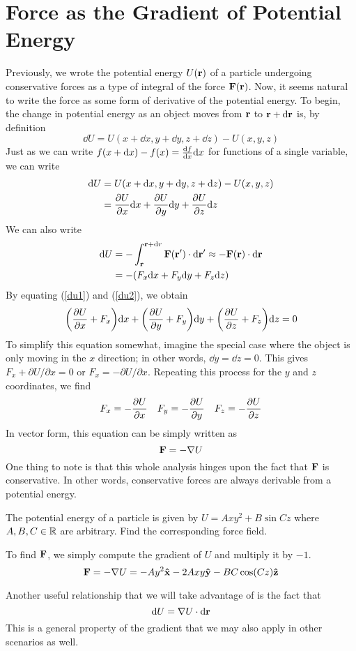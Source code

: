 \section{Force as the Gradient of Potential Energy}
Previously, we wrote the potential energy $U(\mathbf{r})$ of a particle undergoing conservative forces as a type of integral of the force $\mathbf{F}(\mathbf{r})$. Now, it seems natural to write the force as some form of derivative of the potential energy. To begin, the change in potential energy as an object moves from $\mathbf{r}$ to $\mathbf{r} + \dd \mathbf{r}$ is, by definition
\[ \dd U = U(x + \dd x, y + \dd y, z + \dd z) - U(x, y, z) \]
Just as we can write $f(x + \dd x) - f(x) = \dv{f}{x}\dd x$ for functions of a single variable, we can write
\begin{align}
    \dd U &=  U(x + \dd x, y + \dd y, z + \dd z) - U(x, y, z) \nonumber \\
    &= \pdv{U}{x}\dd x + \pdv{U}{y}\dd y + \pdv{U}{z}\dd z \label{du1}
\end{align}
We can also write 
\begin{align}
    \dd U &= -\int_{\mbf r}^{\mbf r + \dd r} \mbf{F}(\mbf{r}') \cdot \dd \mbf{r}' \approx -\mbf{F}(\mbf{r})\cdot \dd \mbf{r} \nonumber \\
    &= -\pqty{F_x\dd x + F_y\dd y + F_z\dd z } \label{du2}
\end{align}
By equating (\ref{du1}) and (\ref{du2}), we obtain
\[ \pqty{\pdv{U}{x} + F_x}\dd x + \pqty{\pdv{U}{y} + F_y}\dd y + \pqty{\pdv{U}{z} + F_z}\dd z = 0\]
To simplify this equation somewhat, imagine the special case where the object is only moving in the $x$ direction; in other words, $\dd y = \dd z = 0$. This gives $F_x + \partial U/\partial x = 0$ or $F_x = -\partial U/\partial x$. Repeating this process for the $y$ and $z$ coordinates, we find
\[ F_x = -\pdv{U}{x} \quad F_y = -\pdv{U}{y} \quad F_z = -\pdv{U}{z} \]
In vector form, this equation can be simply written as 
\[ \mathbf{F} = -\nabla U \]
One thing to note is that this whole analysis hinges upon the fact that $\mathbf{F}$ is conservative. In other words, conservative forces are always derivable from a potential energy. 
\begin{example}
    The potential energy of a particle is given by $U = Axy^2 + B\sin Cz$ where $A,B,C\in\mathbb{R}$ are arbitrary. Find the corresponding force field.
    
    To find $\mathbf{F}$, we simply compute the gradient of $U$ and multiply it by $-1$.
    \[ \mathbf{F} = -\nabla U = -Ay^2\mathbf{\hat{x}} - 2Axy\mathbf{\hat{y}} - BC\cos(Cz)\mathbf{\hat{z}} \]
\end{example}
Another useful relationship that we will take advantage of is the fact that
\[ \dd U = \nabla U \cdot \dd \mathbf{r} \]
This is a general property of the gradient that we may also apply in other scenarios as well.
